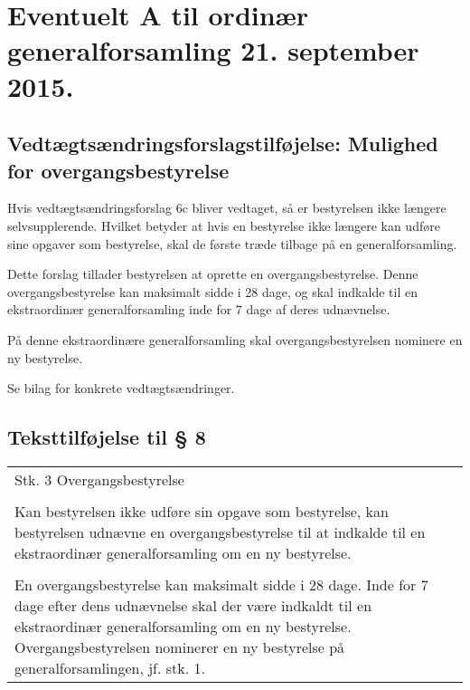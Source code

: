 \documentclass[a4paper,11pt]{report}
\newenvironment{quotationb}%
{\begin{tabular}{|p{10cm}}}%
{\\\end{tabular}}
\begin{document}
\section*{Eventuelt A til ordinær generalforsamling 21. september 2015.}

\subsection*{Vedtægtsændringsforslagstilføjelse: Mulighed for
overgangsbestyrelse}

Hvis vedtægtsændringsforslag 6c bliver vedtaget, så er bestyrelsen ikke længere
selvsupplerende.  Hvilket betyder at hvis en bestyrelse ikke længere kan
udføre sine opgaver som bestyrelse, skal de første træde tilbage på en
generalforsamling.

Dette forslag tillader bestyrelsen at oprette en overgangsbestyrelse.  Denne
overgangsbestyrelse kan maksimalt sidde i 28 dage, og skal indkalde til en
ekstraordinær generalforsamling inde for 7 dage af deres udnævnelse.

På denne ekstraordinære generalforsamling skal overgangsbestyrelsen nominere
en ny bestyrelse.

Se bilag for konkrete vedtægtsændringer.

\begin{appendices}

\section*{Teksttilføjelse til § 8}

\begin{quotationb}
Stk. 3 Overgangsbestyrelse\\
\\
Kan bestyrelsen ikke udføre sin opgave som bestyrelse, kan bestyrelsen
udnævne en overgangsbestyrelse til at indkalde til en ekstraordinær
generalforsamling om en ny bestyrelse.\\
\\
En overgangsbestyrelse kan maksimalt sidde i 28 dage.  Inde for 7 dage efter
dens udnævnelse skal der være indkaldt til en ekstraordinær generalforsamling om
en ny bestyrelse.  Overgangsbestyrelsen nominerer en ny bestyrelse på
generalforsamlingen, jf. stk. 1.
\end{quotationb}

\end{appendices}
\end{document}

